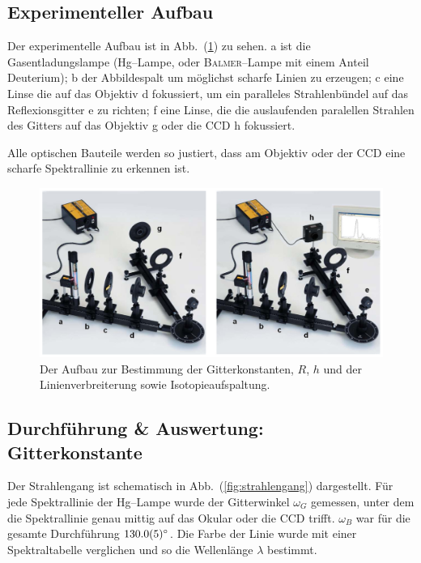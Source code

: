\documentclass[sn-mathphys-num,iicol]{sn-jnl}
\theoremstyle{thmstyleone}
\theoremstyle{thmstyletwo}
\theoremstyle{thmstylethree}
\begin{document}
\subsection{Experimenteller Aufbau}
Der experimentelle Aufbau ist in Abb.\ (\ref{fig:aufbau_spektrallinie}) zu sehen.
a ist die Gasentladungslampe (Hg--Lampe, oder \textsc{Balmer}--Lampe mit einem Anteil Deuterium); b der Abbildespalt um möglichst scharfe Linien zu erzeugen; c eine Linse die auf das Objektiv d fokussiert, um ein paralleles Strahlenbündel auf das Reflexionsgitter e zu richten; f eine Linse, die die auslaufenden paralellen Strahlen des Gitters auf das Objektiv g oder die CCD h fokussiert.

Alle optischen Bauteile werden so justiert, dass am Objektiv oder der CCD eine scharfe Spektrallinie zu erkennen ist.
\begin{figure}[t]
        \centering
        \includegraphics[width=.5\textwidth]{402_aufbau_spektrallinie.png}
        \caption{Der Aufbau zur Bestimmung der Gitterkonstanten, $R$, $h$ und der Linienverbreiterung sowie Isotopieaufspaltung.\cite{Anleitung402}} \label{fig:aufbau_spektrallinie}
\end{figure}

\subsection{Durchführung \& Auswertung:\\Gitterkonstante} \label{sec:d&a:gitterkonstante}
Der Strahlengang ist schematisch in Abb.\ (\ref{fig:strahlengang}) dargestellt.
Für jede Spektrallinie der Hg--Lampe wurde der Gitterwinkel $\omega _G$ gemessen, unter dem die Spektrallinie genau mittig auf das Okular oder die CCD trifft.
$\omega _B$ war für die gesamte Durchführung $\ang{130+-.5}$.
Die Farbe der Linie wurde mit einer Spektraltabelle \cite{Anleitung402} verglichen und so die Wellenlänge $\lambda $ bestimmt.
\end{document}
